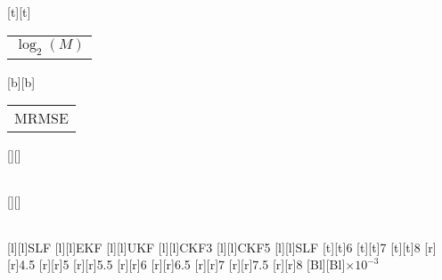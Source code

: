 %
%
[t][t]{\color[rgb]{0,0,0}\setlength{\tabcolsep}{0pt}\begin{tabular}{c}$\log_2 (M)$\end{tabular}}%
[b][b]{\color[rgb]{0,0,0}\setlength{\tabcolsep}{0pt}\begin{tabular}{c}MRMSE\end{tabular}}%
[][]{\color[rgb]{0,0,0}\setlength{\tabcolsep}{0pt}\begin{tabular}{c} \end{tabular}}%
[][]{\color[rgb]{0,0,0}\setlength{\tabcolsep}{0pt}\begin{tabular}{c} \end{tabular}}%
[l][l]{\color[rgb]{0,0,0}SLF}%
[l][l]{\color[rgb]{0,0,0}EKF}%
[l][l]{\color[rgb]{0,0,0}UKF}%
[l][l]{\color[rgb]{0,0,0}CKF3}%
[l][l]{\color[rgb]{0,0,0}CKF5}%
[l][l]{\color[rgb]{0,0,0}SLF}%
%
[t][t]{6}%
[t][t]{7}%
[t][t]{8}%
%
[r][r]{4.5}%
[r][r]{5}%
[r][r]{5.5}%
[r][r]{6}%
[r][r]{6.5}%
[r][r]{7}%
[r][r]{7.5}%
[r][r]{8}%
[Bl][Bl]{$\times 10^{-3}$}%
%
%
